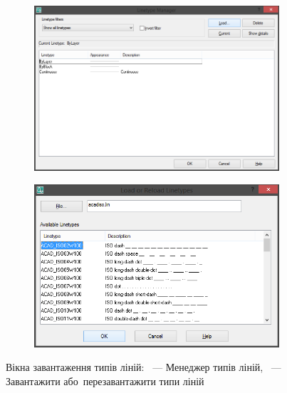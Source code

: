 \documentclass[
	a4paper,
	oneside,
	BCOR = 10mm,
	DIV = 12,
	12pt,
	headings = normal,
]{scrartcl}
\begin{document}
			\begin{figure}[!htbp]
				\begin{subfigure}[b]{0.5\columnwidth}
					\centering
					\includegraphics[height=9\baselineskip]{./assets/y04s01-csdt-lab-01-01-p03.png}
					\caption{}
					\label{subfig:02-linetypes-01}
				\end{subfigure}%
				\begin{subfigure}[b]{0.5\columnwidth}
					\centering
					\includegraphics[height=9\baselineskip]{./assets/y04s01-csdt-lab-01-01-p04.png}
					\caption{}
					\label{subfig:02-linetypes-02}
				\end{subfigure}%
				\caption{Вікна завантаження типів ліній: ~— Менеджер типів ліній, ~— Завантажити або~перезавантажити типи ліній}
				\label{fig:02-linetypes}
			\end{figure}
\end{document}
